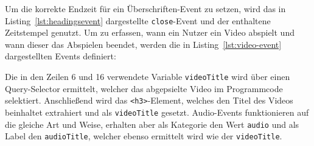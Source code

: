 Um die korrekte Endzeit für ein Überschriften-Event zu setzen, wird das in Listing~\ref{lst:headingsevent} dargestellte \texttt{close}-Event und der enthaltene Zeitstempel genutzt. Um zu erfassen, wann ein Nutzer ein Video abspielt und wann dieser das Abspielen beendet, werden die in Listing~\ref{lst:video-event} dargestellten Events definiert: 

\begin{figure}[H]
    \centering
    \begin{minipage}{\textwidth}
        
    \end{minipage}
\end{figure}

Die in den Zeilen 6 und 16 verwendete Variable \texttt{videoTitle} wird über einen Query-Selector ermittelt, welcher das abgepsielte Video im Programmcode selektiert. Anschließend wird das \texttt{<h3>}-Element, welches den Titel des Videos beinhaltet extrahiert und als \texttt{videoTitle} gesetzt. Audio-Events funktionieren auf die gleiche Art und Weise, erhalten aber als Kategorie den Wert \texttt{audio} und als Label den \texttt{audioTitle}, welcher ebenso ermittelt wird wie der \texttt{videoTitle}.

